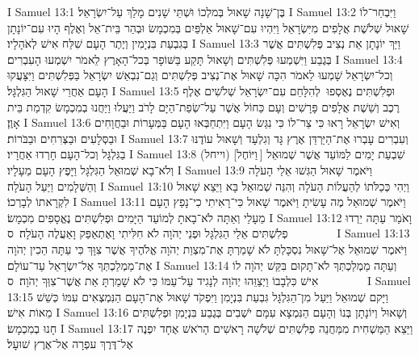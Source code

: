 I Samuel 13:1	בֶּן־שָׁנָה שָׁאוּל בְּמלְכוֹ וּשְׁתֵּי שָׁנִים מָלַךְ עַל־יִשְׂרָאֵל׃
I Samuel 13:2	וַיִּבְחַר־לוֹ שָׁאוּל שְׁלֹשֶׁת אֲלָפִים מִיִּשְׂרָאֵל וַיִּהְיוּ עִם־שָׁאוּל אַלְפַּיִם בְּמִכְמָשׂ וּבְהַר בֵּית־אֵל וְאֶלֶף הָיוּ עִם־יוֹנָתָן בְּגִבְעַת בִּנְיָמִין וְיֶתֶר הָעָם שִׁלַּח אִישׁ לְאֹהָלָיו׃
I Samuel 13:3	וַיַּךְ יוֹנָתָן אֵת נְצִיב פְּלִשְׁתִּים אֲשֶׁר בְּגֶבַע וַיִּשְׁמְעוּ פְּלִשְׁתִּים וְשָׁאוּל תָּקַע בַּשּׁוֹפָר בְּכל־הָאָרֶץ לֵאמֹר יִשְׁמְעוּ הָעִבְרִים׃
I Samuel 13:4	וְכל־יִשְׂרָאֵל שָׁמְעוּ לֵאמֹר הִכָּה שָׁאוּל אֶת־נְצִיב פְּלִשְׁתִּים וְגַם־נִבְאַשׁ יִשְׂרָאֵל בַּפְּלִשְׁתִּים וַיִּצָּעֲקוּ הָעָם אַחֲרֵי שָׁאוּל הַגִּלְגָּל׃
I Samuel 13:5	וּפְלִשְׁתִּים נֶאֶסְפוּ  לְהִלָּחֵם עִם־יִשְׂרָאֵל שְׁלֹשִׁים אֶלֶף רֶכֶב וְשֵׁשֶׁת אֲלָפִים פָּרָשִׁים וְעָם כַּחוֹל אֲשֶׁר עַל־שְׂפַת־הַיָּם לָרֹב וַיַּעֲלוּ וַיַּחֲנוּ בְמִכְמָשׂ קִדְמַת בֵּית אָוֶן׃
I Samuel 13:6	וְאִישׁ יִשְׂרָאֵל רָאוּ כִּי צַר־לוֹ כִּי נִגַּשׂ הָעָם וַיִּתְחַבְּאוּ הָעָם בַּמְּעָרוֹת וּבַחֲוָחִים וּבַסְּלָעִים וּבַצְּרִחִים וּבַבֹּרוֹת׃
I Samuel 13:7	וְעִבְרִים עָבְרוּ אֶת־הַיַּרְדֵּן אֶרֶץ גָּד וְגִלְעָד וְשָׁאוּל עוֹדֶנּוּ בַגִּלְגָּל וְכל־הָעָם חָרְדוּ אַחֲרָיו׃
I Samuel 13:8	(וייחל) [וַיּוֹחֶל ] שִׁבְעַת יָמִים לַמּוֹעֵד אֲשֶׁר שְׁמוּאֵל וְלֹא־בָא שְׁמוּאֵל הַגִּלְגָּל וַיָּפֶץ הָעָם מֵעָלָיו׃
I Samuel 13:9	וַיֹּאמֶר שָׁאוּל הַגִּשׁוּ אֵלַי הָעֹלָה וְהַשְּׁלָמִים וַיַּעַל הָעֹלָה׃
I Samuel 13:10	וַיְהִי כְּכַלֹּתוֹ לְהַעֲלוֹת הָעֹלָה וְהִנֵּה שְׁמוּאֵל בָּא וַיֵּצֵא שָׁאוּל לִקְרָאתוֹ לְבָרְכוֹ׃
I Samuel 13:11	וַיֹּאמֶר שְׁמוּאֵל מֶה עָשִׂיתָ וַיֹּאמֶר שָׁאוּל כִּי־רָאִיתִי כִי־נָפַץ הָעָם מֵעָלַי וְאַתָּה לֹא־בָאתָ לְמוֹעֵד הַיָּמִים וּפְלִשְׁתִּים נֶאֱסָפִים מִכְמָשׂ׃
I Samuel 13:12	וָאֹמַר עַתָּה יֵרְדוּ פְלִשְׁתִּים אֵלַי הַגִּלְגָּל וּפְנֵי יְהֹוָה לֹא חִלִּיתִי וָאֶתְאַפַּק וָאַעֲלֶה הָעֹלָה׃ {ס}        
I Samuel 13:13	וַיֹּאמֶר שְׁמוּאֵל אֶל־שָׁאוּל נִסְכָּלְתָּ לֹא שָׁמַרְתָּ אֶת־מִצְוַת יְהֹוָה אֱלֹהֶיךָ אֲשֶׁר צִוָּךְ כִּי עַתָּה הֵכִין יְהֹוָה אֶת־מַמְלַכְתְּךָ אֶל־יִשְׂרָאֵל עַד־עוֹלָם׃
I Samuel 13:14	וְעַתָּה מַמְלַכְתְּךָ לֹא־תָקוּם בִּקֵּשׁ יְהֹוָה לוֹ אִישׁ כִּלְבָבוֹ וַיְצַוֵּהוּ יְהֹוָה לְנָגִיד עַל־עַמּוֹ כִּי לֹא שָׁמַרְתָּ אֵת אֲשֶׁר־צִוְּךָ יְהֹוָה׃ {ס}        
I Samuel 13:15	וַיָּקם שְׁמוּאֵל וַיַּעַל מִן־הַגִּלְגָּל גִּבְעַת בִּנְיָמִן וַיִּפְקֹד שָׁאוּל אֶת־הָעָם הַנִּמְצְאִים עִמּוֹ כְּשֵׁשׁ מֵאוֹת אִישׁ׃
I Samuel 13:16	וְשָׁאוּל וְיוֹנָתָן בְּנוֹ וְהָעָם הַנִּמְצָא עִמָּם יֹשְׁבִים בְּגֶבַע בִּנְיָמִן וּפְלִשְׁתִּים חָנוּ בְמִכְמָשׂ׃
I Samuel 13:17	וַיֵּצֵא הַמַּשְׁחִית מִמַּחֲנֵה פְלִשְׁתִּים שְׁלֹשָׁה רָאשִׁים הָרֹאשׁ אֶחָד יִפְנֶה אֶל־דֶּרֶךְ עפְרָה אֶל־אֶרֶץ שׁוּעָל׃
